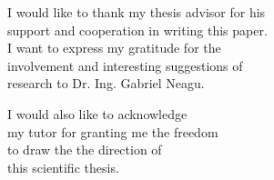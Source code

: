 \vspace*{7cm}
\begin{center}
I would like to thank my thesis advisor for his\\
support and cooperation in writing this paper.\\
I want to express my gratitude for the\\
involvement and interesting suggestions of\\
research to Dr. Ing. Gabriel Neagu.
\end{center}
\vspace{0.6cm}
\begin{center}
I would also like to acknowledge\\
my tutor for granting me the freedom\\
to draw the the direction of\\
this scientific thesis.
\end{center}
